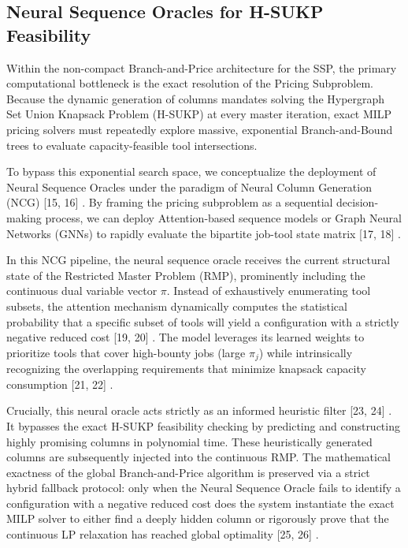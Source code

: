 \documentclass[11pt, a4paper]{book}
\begin{document}
	\subsection{Neural Sequence Oracles for H-SUKP Feasibility}
	
	Within the non-compact Branch-and-Price architecture for the SSP, the primary computational bottleneck is the exact resolution of the Pricing Subproblem. Because the dynamic generation of columns mandates solving the Hypergraph Set Union Knapsack Problem (H-SUKP) at every master iteration, exact MILP pricing solvers must repeatedly explore massive, exponential Branch-and-Bound trees to evaluate capacity-feasible tool intersections.
	
	To bypass this exponential search space, we conceptualize the deployment of Neural Sequence Oracles under the paradigm of Neural Column Generation (NCG)  [15, 16] . By framing the pricing subproblem as a sequential decision-making process, we can deploy Attention-based sequence models or Graph Neural Networks (GNNs) to rapidly evaluate the bipartite job-tool state matrix  [17, 18] . 
	
	In this NCG pipeline, the neural sequence oracle receives the current structural state of the Restricted Master Problem (RMP), prominently including the continuous dual variable vector $\pi$. Instead of exhaustively enumerating tool subsets, the attention mechanism dynamically computes the statistical probability that a specific subset of tools will yield a configuration with a strictly negative reduced cost  [19, 20] . The model leverages its learned weights to prioritize tools that cover high-bounty jobs (large $\pi_j$) while intrinsically recognizing the overlapping requirements that minimize knapsack capacity consumption  [21, 22] .
	
	Crucially, this neural oracle acts strictly as an informed heuristic filter  [23, 24] . It bypasses the exact H-SUKP feasibility checking by predicting and constructing highly promising columns in polynomial time. These heuristically generated columns are subsequently injected into the continuous RMP. The mathematical exactness of the global Branch-and-Price algorithm is preserved via a strict hybrid fallback protocol: only when the Neural Sequence Oracle fails to identify a configuration with a negative reduced cost does the system instantiate the exact MILP solver to either find a deeply hidden column or rigorously prove that the continuous LP relaxation has reached global optimality  [25, 26] .
	
\end{document}

